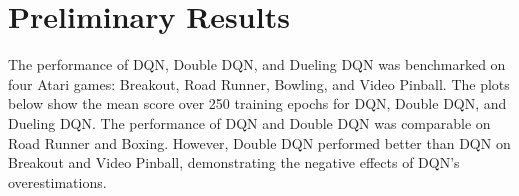 \documentclass{article}
\begin{document}
\section{Preliminary Results}
The performance of DQN, Double DQN, and Dueling DQN was benchmarked on four
Atari games: Breakout, Road Runner, Bowling, and Video Pinball. The plots 
below show the mean score over 250 training epochs for DQN, Double DQN, 
and Dueling DQN. The performance of DQN and Double DQN was comparable on Road Runner and Boxing. However, Double DQN performed better than DQN on Breakout and Video Pinball, demonstrating the negative effects of DQN's overestimations.


\end{document}
